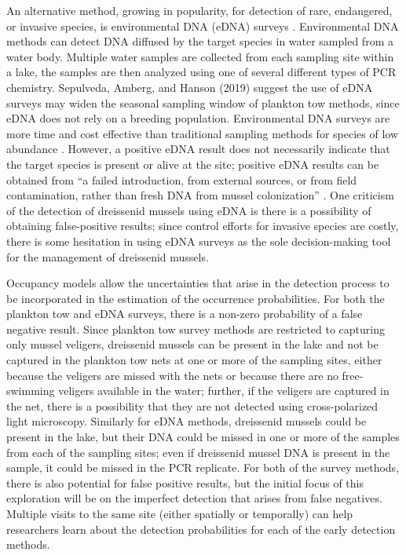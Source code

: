 \documentclass[12pt]{article}\usepackage[]{graphicx}\usepackage[]{color}
\begin{document}
An alternative method, growing in popularity, for detection of rare, endangered, or invasive species, is environmental DNA (eDNA) surveys \cite{Schmelzle}. Environmental DNA methods can detect DNA diffused by the target species in water sampled from a water body. Multiple water samples are collected from each sampling site within a lake, the samples are then analyzed using one of several different types of PCR chemistry. Sepulveda, Amberg, and Hanson (2019) suggest the use of eDNA surveys may widen the seasonal sampling window of plankton tow methods, since eDNA does not rely on a breeding population. Environmental DNA surveys are more time and cost effective than traditional sampling methods for species of low abundance \cite{Rees}. However, a positive eDNA result does not necessarily indicate that the target species is present or alive at the site; positive eDNA results can be obtained from ``a failed introduction, from external sources, or from field contamination, rather than fresh DNA from mussel colonization'' \cite{Sepulveda:eDNA}. One criticism of the detection of dreissenid mussels using eDNA is there is a possibility of obtaining false-positive results; since control efforts for invasive species are costly, there is some hesitation in using eDNA surveys as the sole decision-making tool for the management of dreissenid mussels. 

Occupancy models allow the uncertainties that arise in the detection process to be incorporated in the estimation of the occurrence probabilities. For both the plankton tow and eDNA surveys, there is a non-zero probability of a false negative result. Since plankton tow survey methods are restricted to capturing only mussel veligers, dreissenid mussels can be present in the lake and not be captured in the plankton tow nets at one or more of the sampling sites, either because the veligers are missed with the nets or because there are no free-swimming veligers available in the water; further, if the veligers are captured in the net, there is a possibility that they are not detected using cross-polarized light microscopy. Similarly for eDNA methods, dreissenid mussels could be present in the lake, but their DNA could be missed in one or more of the samples from each of the sampling sites; even if dreissenid mussel DNA is present in the sample, it could be missed in the PCR replicate. For both of the survey methods, there is also potential for false positive results, but the initial focus of this exploration will be on the imperfect detection that arises from false negatives. Multiple visits to the same site (either spatially or temporally) can help researchers learn about the detection probabilities for each of the early detection methods. 
\end{document}
